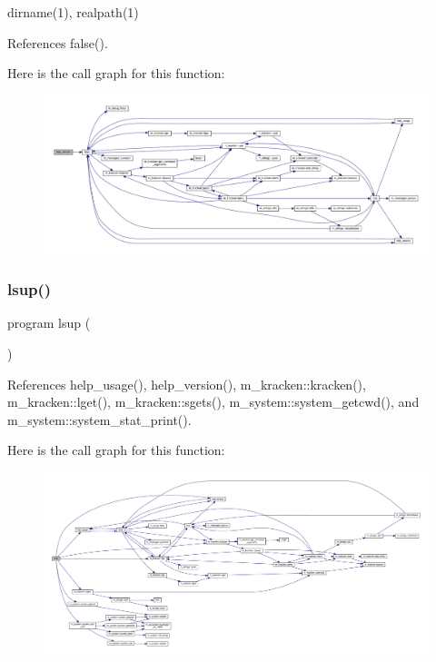 dirname(1), realpath(1) 

References false().

Here is the call graph for this function\+:
\nopagebreak
\begin{figure}[H]
\begin{center}
\leavevmode
\includegraphics[width=350pt]{lsup_8f90_a7566fe8ce05250d40d981110b710d428_cgraph}
\end{center}
\end{figure}
\mbox{\label{lsup_8f90_a3c3d8a93f4c35d7c95cd6db2e692b561}} 
\subsubsection{\texorpdfstring{lsup()}{lsup()}}
{\footnotesize\ttfamily program lsup (\begin{DoxyParamCaption}{ }\end{DoxyParamCaption})}



References help\+\_\+usage(), help\+\_\+version(), m\+\_\+kracken\+::kracken(), m\+\_\+kracken\+::lget(), m\+\_\+kracken\+::sgets(), m\+\_\+system\+::system\+\_\+getcwd(), and m\+\_\+system\+::system\+\_\+stat\+\_\+print().

Here is the call graph for this function\+:
\nopagebreak
\begin{figure}[H]
\begin{center}
\leavevmode
\includegraphics[width=350pt]{lsup_8f90_a3c3d8a93f4c35d7c95cd6db2e692b561_cgraph}
\end{center}
\end{figure}

